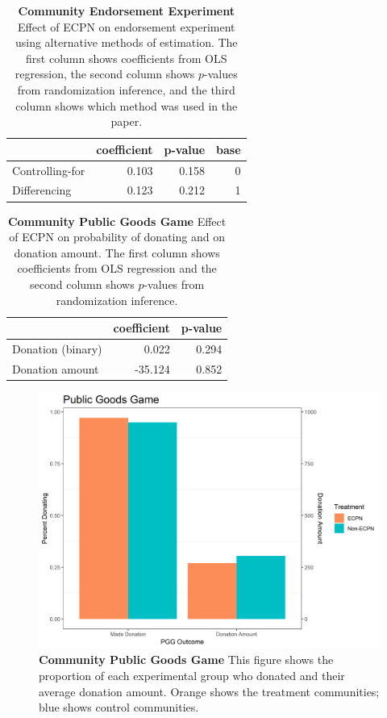\documentclass[
]{article}
\begin{document}
\begin{table}[H]
\begin{center}
\label{tab:endExp_tab}
\caption{\textbf{Community Endorsement Experiment} Effect of ECPN on endorsement experiment using alternative methods of estimation. The first column shows coefficients from OLS regression, the second column shows $p$-values from randomization inference, and the third column shows which method was used in the paper.}
\smallskip

\begin{tabular}{l|r|r|r}
\hline
  & coefficient & p-value & base\\
\hline
Controlling-for & 0.103 & 0.158 & 0\\
\hline
Differencing & 0.123 & 0.212 & 1\\
\hline
\end{tabular}


\end{center}
\end{table}

\begin{table}[H]
\begin{center}
\label{tab:pgg_tab}
\caption{\textbf{Community Public Goods Game} Effect of ECPN on probability of donating and on donation amount. The first column shows coefficients from OLS regression and the second column shows $p$-values from randomization inference.}
\smallskip

\begin{tabular}{l|r|r}
\hline
  & coefficient & p-value\\
\hline
Donation (binary) & 0.022 & 0.294\\
\hline
Donation amount & -35.124 & 0.852\\
\hline
\end{tabular}


\end{center}
\end{table}

\begin{figure}[H]
\begin{center}
\includegraphics[width=.8\textwidth]{figs/pggComm_plot.png}
\caption{\label{fig:pgg_plot_comm} \textbf{Community Public Goods Game} This figure shows the proportion of each experimental group who donated and their average donation amount. Orange shows the treatment communities; blue shows control communities.}
\end{center}
\end{figure}
\end{document}
